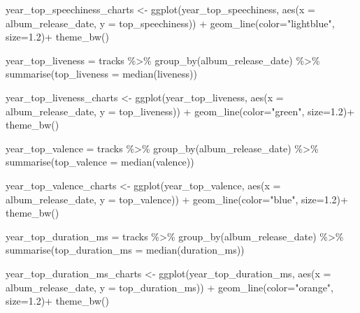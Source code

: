 \documentclass[
]{article}
\newenvironment{Shaded}{\begin{snugshade}}{\end{snugshade}}
\newcommand{\AttributeTok}[1]{\textcolor[rgb]{0.77,0.63,0.00}{#1}}
\newcommand{\FloatTok}[1]{\textcolor[rgb]{0.00,0.00,0.81}{#1}}
\newcommand{\FunctionTok}[1]{\textcolor[rgb]{0.00,0.00,0.00}{#1}}
\newcommand{\NormalTok}[1]{#1}
\newcommand{\OtherTok}[1]{\textcolor[rgb]{0.56,0.35,0.01}{#1}}
\newcommand{\SpecialCharTok}[1]{\textcolor[rgb]{0.00,0.00,0.00}{#1}}
\newcommand{\StringTok}[1]{\textcolor[rgb]{0.31,0.60,0.02}{#1}}
\begin{document}
\begin{Shaded}
\begin{Highlighting}[]
\NormalTok{year\_top\_speechiness\_charts }\OtherTok{\textless{}{-}} \FunctionTok{ggplot}\NormalTok{(year\_top\_speechiness, }\FunctionTok{aes}\NormalTok{(}\AttributeTok{x =}\NormalTok{ album\_release\_date, }\AttributeTok{y =}\NormalTok{ top\_speechiness)) }\SpecialCharTok{+}
  \FunctionTok{geom\_line}\NormalTok{(}\AttributeTok{color=}\StringTok{"lightblue"}\NormalTok{, }\AttributeTok{size=}\FloatTok{1.2}\NormalTok{)}\SpecialCharTok{+}
  \FunctionTok{theme\_bw}\NormalTok{()}

\NormalTok{year\_top\_liveness }\OtherTok{=}\NormalTok{ tracks }\SpecialCharTok{\%\textgreater{}\%}
  \FunctionTok{group\_by}\NormalTok{(album\_release\_date) }\SpecialCharTok{\%\textgreater{}\%}
  \FunctionTok{summarise}\NormalTok{(}\AttributeTok{top\_liveness =} \FunctionTok{median}\NormalTok{(liveness))}

\NormalTok{year\_top\_liveness\_charts }\OtherTok{\textless{}{-}} \FunctionTok{ggplot}\NormalTok{(year\_top\_liveness, }\FunctionTok{aes}\NormalTok{(}\AttributeTok{x =}\NormalTok{ album\_release\_date, }\AttributeTok{y =}\NormalTok{ top\_liveness)) }\SpecialCharTok{+}
  \FunctionTok{geom\_line}\NormalTok{(}\AttributeTok{color=}\StringTok{"green"}\NormalTok{, }\AttributeTok{size=}\FloatTok{1.2}\NormalTok{)}\SpecialCharTok{+}
  \FunctionTok{theme\_bw}\NormalTok{()}

\NormalTok{year\_top\_valence }\OtherTok{=}\NormalTok{ tracks }\SpecialCharTok{\%\textgreater{}\%}
  \FunctionTok{group\_by}\NormalTok{(album\_release\_date) }\SpecialCharTok{\%\textgreater{}\%}
  \FunctionTok{summarise}\NormalTok{(}\AttributeTok{top\_valence =} \FunctionTok{median}\NormalTok{(valence))}

\NormalTok{year\_top\_valence\_charts }\OtherTok{\textless{}{-}} \FunctionTok{ggplot}\NormalTok{(year\_top\_valence, }\FunctionTok{aes}\NormalTok{(}\AttributeTok{x =}\NormalTok{ album\_release\_date, }\AttributeTok{y =}\NormalTok{ top\_valence)) }\SpecialCharTok{+}
  \FunctionTok{geom\_line}\NormalTok{(}\AttributeTok{color=}\StringTok{"blue"}\NormalTok{, }\AttributeTok{size=}\FloatTok{1.2}\NormalTok{)}\SpecialCharTok{+}
  \FunctionTok{theme\_bw}\NormalTok{()}

\NormalTok{year\_top\_duration\_ms }\OtherTok{=}\NormalTok{ tracks }\SpecialCharTok{\%\textgreater{}\%}
  \FunctionTok{group\_by}\NormalTok{(album\_release\_date) }\SpecialCharTok{\%\textgreater{}\%}
  \FunctionTok{summarise}\NormalTok{(}\AttributeTok{top\_duration\_ms =} \FunctionTok{median}\NormalTok{(duration\_ms))}

\NormalTok{year\_top\_duration\_ms\_charts }\OtherTok{\textless{}{-}} \FunctionTok{ggplot}\NormalTok{(year\_top\_duration\_ms, }\FunctionTok{aes}\NormalTok{(}\AttributeTok{x =}\NormalTok{ album\_release\_date, }\AttributeTok{y =}\NormalTok{ top\_duration\_ms)) }\SpecialCharTok{+}
  \FunctionTok{geom\_line}\NormalTok{(}\AttributeTok{color=}\StringTok{"orange"}\NormalTok{, }\AttributeTok{size=}\FloatTok{1.2}\NormalTok{)}\SpecialCharTok{+}
  \FunctionTok{theme\_bw}\NormalTok{()}


\end{Highlighting}
\end{Shaded}
\end{document}
